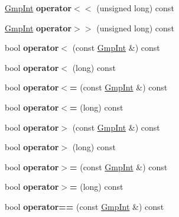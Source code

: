 \begin{DoxyCompactItemize}
\item 
\mbox{\label{class_gmp_int_af349b7a15ac16a17ab341f6061a910cc}} 
\hyperlink{class_gmp_int}{Gmp\+Int} {\bfseries operator$<$$<$} (unsigned long) const
\item 
\mbox{\label{class_gmp_int_a1bc1a03df2dcde64b96aa0cee7bca642}} 
\hyperlink{class_gmp_int}{Gmp\+Int} {\bfseries operator$>$$>$} (unsigned long) const
\item 
\mbox{\label{class_gmp_int_a2d8f111fd0545fa966a87052656aad50}} 
bool {\bfseries operator$<$} (const \hyperlink{class_gmp_int}{Gmp\+Int} \&) const
\item 
\mbox{\label{class_gmp_int_a02c05a80980e0070957ad2afe94271b1}} 
bool {\bfseries operator$<$} (long) const
\item 
\mbox{\label{class_gmp_int_a9ff21cbfa7e02fd55e5695ae17c9cf1f}} 
bool {\bfseries operator$<$=} (const \hyperlink{class_gmp_int}{Gmp\+Int} \&) const
\item 
\mbox{\label{class_gmp_int_a6049c67e480aecf414a28125a9ce3257}} 
bool {\bfseries operator$<$=} (long) const
\item 
\mbox{\label{class_gmp_int_aef2b82e000e75f177302f3ae7835d9b8}} 
bool {\bfseries operator$>$} (const \hyperlink{class_gmp_int}{Gmp\+Int} \&) const
\item 
\mbox{\label{class_gmp_int_ab1826d58b6369760298d0a35b6757081}} 
bool {\bfseries operator$>$} (long) const
\item 
\mbox{\label{class_gmp_int_a09ecc7acd157cbcd011a83c901051094}} 
bool {\bfseries operator$>$=} (const \hyperlink{class_gmp_int}{Gmp\+Int} \&) const
\item 
\mbox{\label{class_gmp_int_a5e24d17de3ee02e17c1ce9abcd094d65}} 
bool {\bfseries operator$>$=} (long) const
\item 
\mbox{\label{class_gmp_int_aff1fdbede44b450b1ec3c2fe8d17f15b}} 
bool {\bfseries operator==} (const \hyperlink{class_gmp_int}{Gmp\+Int} \&) const

\end{DoxyCompactItemize}
